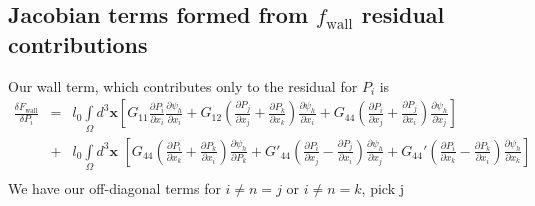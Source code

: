 \documentclass[16pt]{article} %
\begin{document}
\subsection*{Jacobian terms formed from $f_\mathrm{wall}$ residual contributions}
%
Our wall term, which contributes only to the residual for $P_i$ is
%
\begin{eqnarray}\nonumber
 \frac{\delta F_\mathrm{wall}}{\delta P_i} &=&l_0 \int\limits_\Omega d^3 {\boldsymbol x} \left[G_{11} \frac{\partial P_i}{\partial x_i} \frac{\partial \psi_h}{\partial x_i} + G_{12} \left(\frac{\partial P_j}{\partial x_j} + \frac{\partial P_k}{\partial x_k} \right) \frac{\partial \psi_h}{\partial x_i} + G_{44} \left(\frac{\partial P_i}{\partial x_j} + \frac{\partial P_j}{\partial x_i} \right)\frac{\partial \psi_h}{\partial x_j} \right]\\ \nonumber
&+&l_0 \int\limits_\Omega d^3 {\boldsymbol x} \,\,\left[ G_{44} \left(\frac{\partial P_i}{\partial x_k} + \frac{\partial P_k}{\partial x_i} \right) \frac{\partial \psi_h}{\partial P_k} + G'_{44} \left(\frac{\partial P_i}{\partial x_j}  - \frac{\partial P_j}{\partial x_i}\right) \frac{\partial \psi_h}{\partial x_j} + G_{44}' \left(\frac{\partial P_i}{\partial x_k} - \frac{\partial P_k}{\partial x_i} \right) \frac{\partial \psi_h}{\partial x_k}\right]\\ \nonumber
\end{eqnarray}
We have our off-diagonal terms for $i \neq n = j$ or $i \neq n = k$, pick j
%
\end{document}
